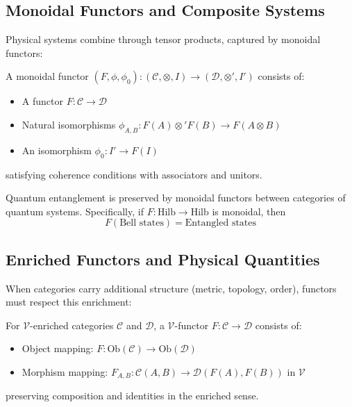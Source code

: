 \subsection{Monoidal Functors and Composite Systems}

Physical systems combine through tensor products, captured by monoidal functors:

\begin{definition}
A monoidal functor $(F, \phi, \phi_0): (\mathcal{C}, \otimes, I) \to (\mathcal{D}, \otimes', I')$ consists of:
\begin{itemize}
\item A functor $F: \mathcal{C} \to \mathcal{D}$
\item Natural isomorphisms $\phi_{A,B}: F(A) \otimes' F(B) \to F(A \otimes B)$
\item An isomorphism $\phi_0: I' \to F(I)$
\end{itemize}
satisfying coherence conditions with associators and unitors.
\end{definition}

\begin{theorem}
Quantum entanglement is preserved by monoidal functors between categories of quantum systems. Specifically, if $F: \text{Hilb} \to \text{Hilb}$ is monoidal, then
\[
F(\text{Bell states}) = \text{Entangled states}
\]
\end{theorem}

\subsection{Enriched Functors and Physical Quantities}

When categories carry additional structure (metric, topology, order), functors must respect this enrichment:

\begin{definition}
For $\mathcal{V}$-enriched categories $\mathcal{C}$ and $\mathcal{D}$, a $\mathcal{V}$-functor $F: \mathcal{C} \to \mathcal{D}$ consists of:
\begin{itemize}
\item Object mapping: $F: \text{Ob}(\mathcal{C}) \to \text{Ob}(\mathcal{D})$
\item Morphism mapping: $F_{A,B}: \mathcal{C}(A,B) \to \mathcal{D}(F(A), F(B))$ in $\mathcal{V}$
\end{itemize}
preserving composition and identities in the enriched sense.
\end{definition}

